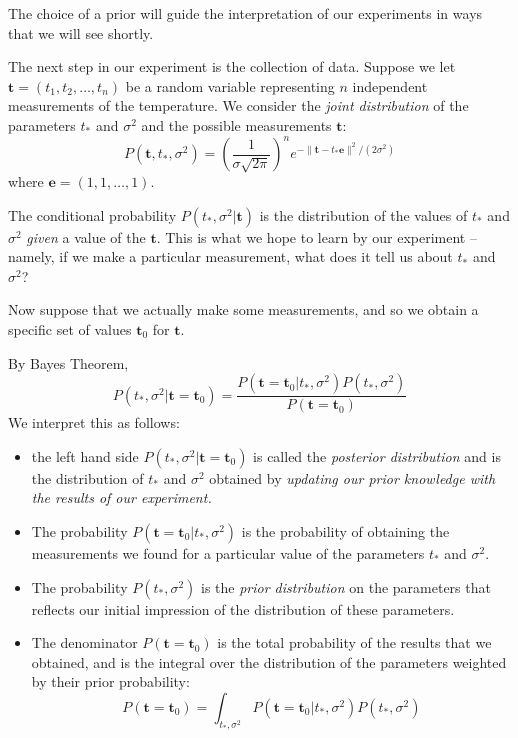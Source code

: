 \documentclass[
]{article}
\providecommand{\tightlist}{%
  \setlength{\itemsep}{0pt}\setlength{\parskip}{0pt}}
\begin{document}
The choice of a prior will guide the interpretation of our experiments
in ways that we will see shortly.

The next step in our experiment is the collection of data. Suppose we
let \(\mathbf{t}=(t_1,t_2,\ldots, t_n)\) be a random variable
representing \(n\) independent measurements of the temperature. We
consider the \emph{joint distribution} of the parameters \(t_*\) and
\(\sigma^2\) and the possible measurements \(\mathbf{t}\): \[
P(\mathbf{t},t_*,\sigma^2)=\left(\frac{1}{\sigma\sqrt{2\pi}}\right)^{n}e^{-\|\mathbf{t}-t_*\mathbf{e}\|^2/(2\sigma^2)}
\] where \(\mathbf{e}=(1,1,\ldots, 1)\).

The conditional probability \(P(t_{*},\sigma^2|\mathbf{t})\) is the
distribution of the values of \(t_*\) and \(\sigma^2\) \emph{given} a
value of the \(\mathbf{t}\). This is what we hope to learn by our
experiment -- namely, if we make a particular measurement, what does it
tell us about \(t_*\) and \(\sigma^2\)?

Now suppose that we actually make some measurements, and so we obtain a
specific set of values \(\mathbf{t}_0\) for \(\mathbf{t}\).

By Bayes Theorem, \[
P(t_{*},\sigma^2|\mathbf{t}=\mathbf{t}_0) = \frac{P(\mathbf{t}=\mathbf{t}_0|t_{*},\sigma^2)P(t_{*},\sigma^2)}{P(\mathbf{t}=\mathbf{t}_0)}
\] We interpret this as follows:

\begin{itemize}
\tightlist
\item
  the left hand side \(P(t_{*},\sigma^2|\mathbf{t}=\mathbf{t}_0)\) is
  called the \emph{posterior distribution} and is the distribution of
  \(t_{*}\) and \(\sigma^2\) obtained by \emph{updating our prior
  knowledge with the results of our experiment.}
\item
  The probability \(P(\mathbf{t}=\mathbf{t}_{0}|t_{*},\sigma^2)\) is the
  probability of obtaining the measurements we found for a particular
  value of the parameters \(t_{*}\) and \(\sigma^2\).
\item
  The probability \(P(t_{*},\sigma^2)\) is the \emph{prior distribution}
  on the parameters that reflects our initial impression of the
  distribution of these parameters.
\item
  The denominator \(P(\mathbf{t}=\mathbf{t}_{0})\) is the total
  probability of the results that we obtained, and is the integral over
  the distribution of the parameters weighted by their prior
  probability: \[
  P(\mathbf{t}=\mathbf{t}_{0})=\int_{t_{*},\sigma^2}P(\mathbf{t}=\mathbf{t}_{0}|t_{*},\sigma^2)P(t_{*},\sigma^2)
  \]
\end{itemize}
\end{document}
